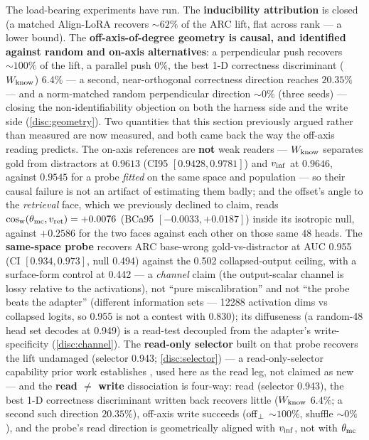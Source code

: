 The load-bearing experiments have run. The \textbf{inducibility attribution} is
closed (a matched Align-LoRA recovers ${\sim}62\%$ of the ARC lift, flat across
rank --- a lower bound). The \textbf{off-axis-of-degree geometry is causal, and
identified against random and on-axis alternatives}: a perpendicular push recovers
${\sim}100\%$ of the lift, a parallel
push 0\%, the best 1-D correctness discriminant ($W_{\mathrm{know}}$) 6.4\% --- a second,
near-orthogonal correctness direction reaches $20.35\%$ --- and a norm-matched
random perpendicular direction ${\sim}0\%$ (three seeds) --- closing the
non-identifiability objection on both the harness side and the write side
(\cref{disc:geometry}). Two quantities that this section previously argued rather
than measured are now measured, and both came back the way the off-axis reading
predicts. The on-axis references are \textbf{not} weak readers --- $W_{\mathrm{know}}$ separates
gold from distractors at $0.9613$ (CI95 $[0.9428, 0.9781]$) and $v_{\mathrm{inf}}$ at $0.9646$,
against $0.9545$ for a probe \emph{fitted} on the same space and population --- so
their causal failure is not an artifact of estimating them badly; and the offset's
angle to the \emph{retrieval} face, which we previously declined to claim, reads
$\cos_{\mathrm{w}}(\theta_{\mathrm{mc}},v_{\mathrm{ret}}) = +0.0076$ (BCa95 $[-0.0033, +0.0187]$) inside its isotropic
null, against $+0.2586$ for the two faces against each other on those same $48$
heads. The \textbf{same-space probe} recovers ARC base-wrong
gold-vs-distractor at AUC 0.955 (CI $[0.934, 0.973]$, null 0.494) against the
0.502 collapsed-output ceiling, with a surface-form control at 0.442 --- a
\emph{channel} claim (the output-scalar channel is lossy relative to the
activations), not ``pure miscalibration'' and not ``the probe beats the adapter''
(different information sets --- 12288 activation dims vs collapsed logits, so
0.955 is not a contest with 0.830); its diffuseness (a random-48 head set decodes
at 0.949) is a read-test decoupled from the adapter's write-specificity
(\cref{disc:channel}). The \textbf{read-only selector} built on that probe recovers
the lift undamaged (selector 0.943; \cref{disc:selector}) --- a read-only-selector
capability prior work establishes \citep{NoVo,CORAL}, used here as the read leg,
not claimed as new --- and the \textbf{read ${\neq}$ write} dissociation is
four-way: read (selector 0.943), the best 1-D correctness discriminant written back
recovers little ($W_{\mathrm{know}}$ 6.4\%; a second such direction $20.35\%$), off-axis
write succeeds ($\mathrm{off}_{\perp}$ ${\sim}100\%$, shuffle ${\sim}0\%$), and the probe's
read direction is geometrically aligned with $v_{\mathrm{inf}}$, not with $\theta_{\mathrm{mc}}$
